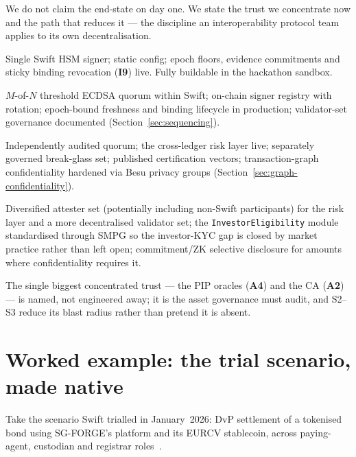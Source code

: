 \documentclass[11pt,a4paper]{article}
\newcommand{\Aref}[1]{\textbf{A#1}}
\newcommand{\Iref}[1]{\textbf{I#1}}
\begin{document}
We do not claim the end-state on day one. We state the trust we concentrate now
and the path that reduces it --- the discipline an interoperability protocol team
applies to its own decentralisation.
\begin{description}[leftmargin=2.6em,itemsep=2pt]
  \item[\textbf{S0} (today; demo).] Single Swift HSM signer; static config; epoch
  floors, evidence commitments and sticky binding revocation (\Iref{9}) live.
  Fully buildable in the hackathon sandbox.
  \item[\textbf{S1}.] $M$-of-$N$ threshold ECDSA quorum within Swift; on-chain
  signer registry with rotation; epoch-bound freshness and binding lifecycle in
  production; validator-set governance documented (Section~\ref{sec:sequencing}).
  \item[\textbf{S2}.] Independently audited quorum; the cross-ledger risk layer
  live; separately governed break-glass set; published certification vectors;
  transaction-graph confidentiality hardened via Besu privacy groups
  (Section~\ref{sec:graph-confidentiality}).
  \item[\textbf{S3}.] Diversified attester set (potentially including non-Swift
  participants) for the risk layer and a more decentralised validator set; the
  \texttt{InvestorEligibility} module standardised through SMPG so the investor-KYC
  gap is closed by market practice rather than left open; commitment/ZK selective
  disclosure for amounts where confidentiality requires it.
\end{description}
The single biggest concentrated trust --- the PIP oracles (\Aref{4}) and the CA
(\Aref{2}) --- is named, not engineered away; it is the asset governance must
audit, and S2--S3 reduce its blast radius rather than pretend it is absent.

\section{Worked example: the trial scenario, made native}
\label{sec:example}

Take the scenario Swift trialled in January~2026: DvP settlement of a tokenised
bond using SG-FORGE's platform and its EURCV stablecoin, across paying-agent,
custodian and registrar roles~\cite{fstrial,swiftledgerpr}.
\end{document}
